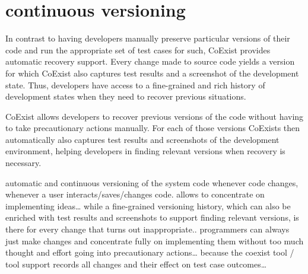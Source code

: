 \section{continuous versioning}

In contrast to having developers manually preserve particular versions of their code and run the appropriate set of test cases for such, CoExist provides automatic recovery support.
Every change made to source code yields a version for which CoExist also captures test results and a screenshot of the development state.
Thus, developers have access to a fine-grained and rich history of development states when they need to recover previous situations.

CoExist allows developers to recover previous versions of the code without having to take precautionary actions manually.
For each of those versions CoExists then automatically also captures test results and screenshots of the development environment, helping developers in finding relevant versions when recovery is necessary.


automatic and continuous versioning of the system code whenever code changes, whenever a user interacts/saves/changes code.
allows to concentrate on implementing ideas… while a fine-grained versioning history, which can also be enriched with test results and screenshots to support finding relevant versions, is there for every change that turns out inappropriate.. programmers can always just make changes and concentrate fully on implementing them without too much thought and effort going into precautionary actions… because the coexist tool / tool support records all changes and their effect on test case outcomes… 



% 

